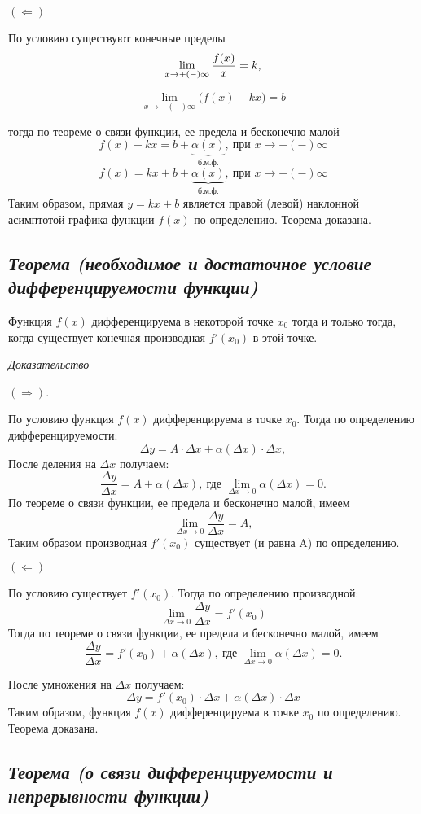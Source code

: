 $(\Leftarrow)$

По условию существуют конечные пределы $$\lim\limits_{x \to +(-)\infty}{\Large\frac{f(x)}{x}} = k,$$

$$\lim\limits_{x \to +(-)\infty}{\big(f(x) - kx\big)} = b$$

тогда по теореме о связи функции, ее предела и бесконечно малой $${f(x) - kx} = b + \underbrace{\alpha(x)}_{\text{б.м.ф.}},\ \text{при } x \rightarrow +(-)\infty$$ $${f(x)} = kx + b + \underbrace{\alpha(x)}_{\text{б.м.ф.}},\ \text{при } x \rightarrow +(-)\infty$$ Таким образом, прямая $y = kx + b$ является правой (левой) наклонной асимптотой графика функции $f(x)$ по определению. Теорема доказана.
\newpage 
\subsection{\textit{Теорема (необходимое и достаточное условие дифференцируемости функции)}}

Функция $f(x)$ дифференцируема в некоторой точке $x_0$ тогда и только тогда, когда существует конечная производная $f'(x_0)$ в этой точке.

\textit{Доказательство}

$(\Rightarrow)$.

По условию функция $f(x)$ дифференцируема в точке $x_0$. Тогда по определению дифференцируемости: $$\Delta y  = A \cdot \Delta x + \alpha(\Delta x)\cdot \Delta x,$$ После деления на $\Delta x$ получаем: $$\frac{\Delta y}{\Delta x}
= A + \alpha(\Delta x), \ \text{где } \lim\limits_{\Delta x \rightarrow 0}\alpha(\Delta x) = 0.$$ По теореме о связи функции, ее предела и бесконечно малой, имеем $$\lim\limits_{\Delta x \rightarrow 0}\frac{\Delta y}{\Delta x} = A,$$ Таким образом производная $f'(x_0)$ существует (и равна A) по определению.

$(\Leftarrow)$

По условию существует $f'(x_0)$. Тогда по определению производной: $$\lim\limits_{\Delta x \rightarrow 0}\frac{\Delta y}{\Delta x} = f'(x_0)$$ Тогда по теореме о связи функции, ее предела и бесконечно малой, имеем $$\frac{\Delta y}{\Delta x} = f'(x_0) + \alpha(\Delta x), \ \text{где } \lim\limits_{\Delta x \rightarrow 0}\alpha(\Delta x) = 0.$$

После умножения на $\Delta x$ получаем: $$\Delta y = f'(x_0)\cdot \Delta x + \alpha(\Delta x)\cdot \Delta x$$ Таким образом, функция $f(x)$ дифференцируема в точке $x_0$ по определению. Теорема доказана.
\newpage 
\subsection{\textit{Теорема (о связи дифференцируемости и непрерывности функции)}}


